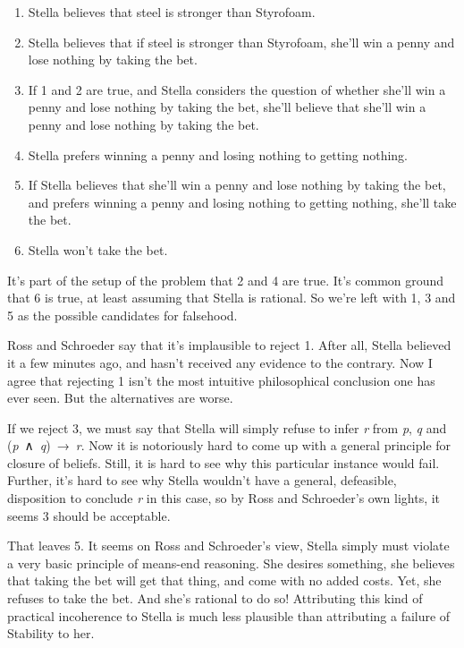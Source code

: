 \documentclass[
  10pt,
  letterpaper,
  twoside]{scrbook}
\providecommand{\tightlist}{%
  \setlength{\itemsep}{0pt}\setlength{\parskip}{0pt}}\usepackage{longtable,booktabs,array}
\begin{document}
\begin{enumerate}
\def\labelenumi{\arabic{enumi}.}
\tightlist
\item
  Stella believes that steel is stronger than Styrofoam.
\item
  Stella believes that if steel is stronger than Styrofoam, she'll win a
  penny and lose nothing by taking the bet.
\item
  If 1 and 2 are true, and Stella considers the question of whether
  she'll win a penny and lose nothing by taking the bet, she'll believe
  that she'll win a penny and lose nothing by taking the bet.
\item
  Stella prefers winning a penny and losing nothing to getting nothing.
\item
  If Stella believes that she'll win a penny and lose nothing by taking
  the bet, and prefers winning a penny and losing nothing to getting
  nothing, she'll take the bet.
\item
  Stella won't take the bet.
\end{enumerate}

It's part of the setup of the problem that 2 and 4 are true. It's common
ground that 6 is true, at least assuming that Stella is rational. So
we're left with 1, 3 and 5 as the possible candidates for falsehood.

Ross and Schroeder say that it's implausible to reject 1. After all,
Stella believed it a few minutes ago, and hasn't received any evidence
to the contrary. Now I agree that rejecting 1 isn't the most intuitive
philosophical conclusion one has ever seen. But the alternatives are
worse.

If we reject 3, we must say that Stella will simply refuse to infer
\emph{r} from \emph{p}, \emph{q} and (\emph{p}~∧~\emph{q})~→~\emph{r}.
Now it is notoriously hard to come up with a general principle for
closure of beliefs. Still, it is hard to see why this particular
instance would fail. Further, it's hard to see why Stella wouldn't have
a general, defeasible, disposition to conclude \emph{r} in this case, so
by Ross and Schroeder's own lights, it seems 3 should be acceptable.

That leaves 5. It seems on Ross and Schroeder's view, Stella simply must
violate a very basic principle of means-end reasoning. She desires
something, she believes that taking the bet will get that thing, and
come with no added costs. Yet, she refuses to take the bet. And she's
rational to do so! Attributing this kind of practical incoherence to
Stella is much less plausible than attributing a failure of Stability to
her.
\end{document}
